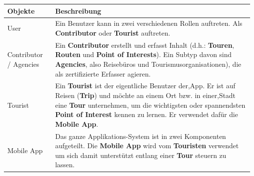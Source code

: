 \documentclass[ngerman,]{article}
\begin{document}
\begin{longtable}[]{@{}ll@{}}
\toprule
\begin{minipage}[b]{0.08\columnwidth}\raggedright\strut
\textbf{Objekte}\strut
\end{minipage} & \begin{minipage}[b]{0.86\columnwidth}\raggedright\strut
\textbf{Beschreibung}\strut
\end{minipage}\tabularnewline
\midrule
\endhead
\begin{minipage}[t]{0.08\columnwidth}\raggedright\strut
User\strut
\end{minipage} & \begin{minipage}[t]{0.86\columnwidth}\raggedright\strut
Ein Benutzer kann in zwei verschiedenen Rollen auftreten. Als
\textbf{Contributor} oder \textbf{Tourist} auftreten.\strut
\end{minipage}\tabularnewline
\begin{minipage}[t]{0.08\columnwidth}\raggedright\strut
Contributor / Agencies\strut
\end{minipage} & \begin{minipage}[t]{0.86\columnwidth}\raggedright\strut
Ein \textbf{Contributor} erstellt und erfasst Inhalt (d.h.:
\textbf{Touren}, \textbf{Routen} und \textbf{Point of Interests}). Ein
Subtyp davon sind \textbf{Agencies}, also Reisebüros und
Tourismusorganisationen), die als zertifizierte Erfasser agieren.\strut
\end{minipage}\tabularnewline
\begin{minipage}[t]{0.08\columnwidth}\raggedright\strut
Tourist\strut
\end{minipage} & \begin{minipage}[t]{0.86\columnwidth}\raggedright\strut
Ein \textbf{Tourist} ist der eigentliche Benutzer der,App. Er ist auf
Reisen (\textbf{Trip}) und möchte an einem Ort bzw. in einer,Stadt eine
\textbf{Tour} unternehmen, um die wichtigsten oder spannendsten
\textbf{Point of Interest} kennen zu lernen. Er verwendet dafür die
\textbf{Mobile App}.\strut
\end{minipage}\tabularnewline
\begin{minipage}[t]{0.08\columnwidth}\raggedright\strut
Mobile App\strut
\end{minipage} & \begin{minipage}[t]{0.86\columnwidth}\raggedright\strut
Das ganze Applikations-System ist in zwei Komponenten aufgeteilt. Die
\textbf{Mobile App} wird vom \textbf{Touristen} verwendet um sich damit
unterstützt entlang einer \textbf{Tour} steuern zu lassen.\strut

\end{minipage}
\end{longtable}
\end{document}
